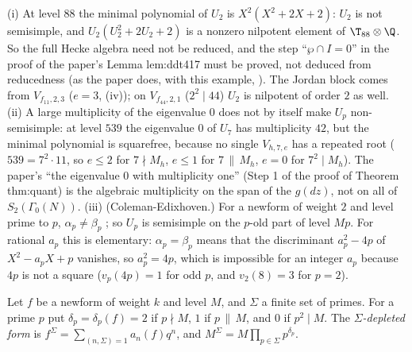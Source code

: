 \begin{remark}\label{rem:hecke:non-semisimple}
(i) At level $88$ the minimal polynomial of $U_2$ is $X^2(X^2+2X+2)$: $U_2$ is not semisimple, and $U_2(U_2^2+2U_2+2)$ is a nonzero nilpotent element of $\T_{88}\otimes\Q$. So the full Hecke
algebra need not be reduced, and the step ``$\wp\cap I=0$'' in the proof of the paper's Lemma lem:ddt417 must be proved, not deduced from reducedness (as the paper does, with this example,
). The Jordan block comes from $V_{f_{11},2,3}$ ($e=3$, (iv)); on $V_{f_{44},2,1}$ ($2^2\mid44$) $U_2$ is nilpotent of order $2$ as well. (ii) A
large multiplicity of the eigenvalue $0$ does not by itself make $U_p$ non-semisimple: at level $539$ the eigenvalue $0$ of $U_7$ has multiplicity $42$, but the minimal polynomial
is squarefree, because no single $V_{h,7,e}$ has a repeated root ($539=7^2\cdot11$, so $e\le2$ for $7\nmid M_h$, $e\le1$ for $7\,\|\,M_h$, $e=0$ for $7^2\mid M_h$). The paper's ``the eigenvalue $0$ with
multiplicity one'' (Step 1 of the proof of Theorem thm:quant) is the algebraic multiplicity on the span of the $g(dz)$, not on all of $S_2(\Gamma_0(N))$. (iii) (Coleman-Edixhoven.) For a
newform of weight $2$ and level prime to $p$, $\alpha_p\ne\beta_p$ \cite{ColemanEdixhoven}; so $U_p$ is semisimple on the $p$-old part of level $Mp$. For rational $a_p$ this is
elementary: $\alpha_p=\beta_p$ means that the discriminant $a_p^2-4p$ of $X^2-a_pX+p$ vanishes, so $a_p^2=4p$, which is impossible for an integer $a_p$ because $4p$ is not a
square ($v_p(4p)=1$ for odd $p$, and $v_2(8)=3$ for $p=2$).
\end{remark}

\begin{definition}\label{def:hecke:depletion}
Let $f$ be a newform of weight $k$ and level $M$, and $\Sigma$ a finite set of primes. For a prime $p$ put $\delta_p=\delta_p(f)=2$ if $p\nmid M$, $1$ if $p\,\|\,M$, and $0$ if $p^2\mid M$. The
\emph{$\Sigma$-depleted form} is $f^\Sigma=\sum_{(n,\Sigma)=1}a_n(f)q^n$, and $M^\Sigma=M\prod_{p\in\Sigma}p^{\delta_p}$.
\end{definition}

